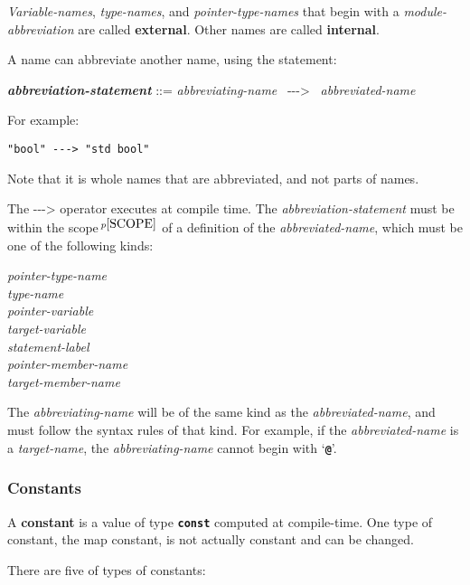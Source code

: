 \documentclass[12pt]{article}
\newcommand{\TT}[1]{{\tt \bfseries #1}}
\newcommand{\ABV}{-{}-{}->}
\newcommand{\key}[1]{{\rm \bfseries #1}}
\newcommand{\ttkey}[1]{{\tt \bfseries #1}}
\newcommand{\emkey}[1]{{\em \bfseries #1}}
\newcommand{\pagnote}[1]{$\,^{p\pageref{#1}}$}
\newenvironment{indpar}[1][0.3in]%
	{\begin{list}{}%
		     {\setlength{\itemsep}{0in}%
		      \setlength{\topsep}{0in}%
		      \setlength{\parsep}{1ex}%
		      \setlength{\labelwidth}{#1}%
		      \setlength{\leftmargin}{#1}%
		      \addtolength{\leftmargin}{\labelsep}}%
	 \item}%
	{\end{list}}
\begin{document}
{\em Variable-names}, {\em type-names}, and {\em pointer-type-names}
that begin with a {\em module-abbreviation} are called
\key{external}\label{EXTERNAL-NAME}.
Other names are called \key{internal}\label{INTERNAL-NAME}.

A name can abbreviate another name, using the statement:
\begin{indpar}
\emkey{abbreviation-statement}\label{ABBREVIATION-STATEMENT} ::=
    {\em abbreviating-name}~ \ABV{}~ {\em abbreviated-name}
\end{indpar}
For example:
\begin{center}
\tt "bool" \ABV{} "std bool"
\end{center}

Note that it is whole names that are abbreviated, and not parts of
names.

The \ABV{} operator executes at compile time.  The {\em abbreviation-statement}
must be within the scope\pagnote{SCOPE}
of a definition of the {\em abbreviated-name},
which must be one of the following kinds:
\begin{center} \em
pointer-type-name \\
type-name \\
pointer-variable \\
target-variable \\
statement-label \\
pointer-member-name \\
target-member-name
\end{center}
The {\em abbreviating-name} will be of the same kind as the
{\em abbreviated-name}, and must follow the syntax rules of that
kind.  For example, if the {\em abbreviated-name}
is a {\em target-name}, the {\em abbreviating-name} cannot begin with
`\TT{@}'.


\subsubsection{Constants}
\label{CONSTANTS}

A \key{constant} is a value of type \ttkey{const} computed at
compile-time.  One type of constant, the map constant, is not
actually constant and can be changed.

There are five of types of constants:
\end{document}
